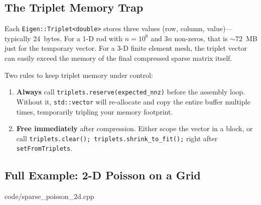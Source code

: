 \subsection{The Triplet Memory Trap}

Each \texttt{Eigen::Triplet<double>} stores three values (row, column,
value)---typically 24~bytes.  For a 1-D rod with $n = 10^6$ and $3n$
non-zeros, that is $\sim\!72$~MB just for the temporary vector.
For a 3-D finite element mesh, the triplet vector can easily exceed the
memory of the final compressed sparse matrix itself.

\begin{tipbox}
Two rules to keep triplet memory under control:
\begin{enumerate}[nosep]
    \item \textbf{Always} call \texttt{triplets.reserve(expected\_nnz)}
          before the assembly loop.  Without it, \texttt{std::vector}
          will re-allocate and copy the entire buffer multiple times,
          temporarily tripling your memory footprint.
    \item \textbf{Free immediately} after compression.  Either scope the
          vector in a block, or call
          \texttt{triplets.clear(); triplets.shrink\_to\_fit();}
          right after \texttt{setFromTriplets}.
\end{enumerate}
\end{tipbox}

\subsection{Full Example: 2-D Poisson on a Grid}


                {code/sparse_poisson_2d.cpp}
